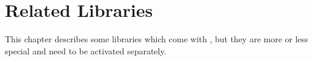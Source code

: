 
\part[libs]{Related Libraries}

This chapter describes some libraries which come with \PGFPlots{}, but they are
more or less special and need to be activated separately.

% 














